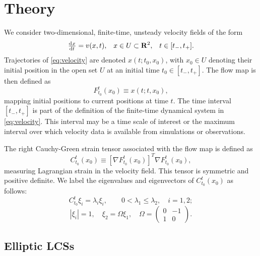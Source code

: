 \documentclass{article}
\begin{document}
\section{Theory}

We consider two-dimensional, finite-time, unsteady velocity fields of the form
\begin{align}
\od{x}{t} = v(x,t), && x \in U \subset \mathbf R^2, && t \in [t_-,t_+].
\label{eq:velocity}
\end{align}
Trajectories of \cref{eq:velocity} are denoted $x(t;t_0,x_0)$, with $x_0 \in U$ denoting their initial position in the open set $U$ at an initial time $t_0 \in [t_-,t_+]$. The flow map is then defined as
\[
F_{t_0}^t(x_0) \equiv x(t;t,x_0),
\]
mapping initial positions to current positions at time $t$. The time interval $[t_-,t_+]$ is part of the definition of the finite-time dynamical system in \cref{eq:velocity}. This interval may be a time scale of interest or the maximum interval over which velocity data is available from simulations or observations.

The right Cauchy-Green strain tensor associated with the flow map is defined as
\begin{equation}
C_{t_0}^t(x_0) \equiv \left[\nabla F_{t_0}^t(x_0)\right]^T \nabla F_{t_0}^t(x_0),
\label{eq:CG}
\end{equation}
measuring Lagrangian strain in the velocity field. This tensor is symmetric and positive definite\parencite{truesdell04}. We label the eigenvalues and eigenvectors of $C_{t_0}^t(x_0)$ as follows:
\[
C_{t_0}^t \xi_i = \lambda_i \xi_i, \qquad 0 < \lambda_1 \leq \lambda_2, \quad i = 1,2;
\]
\begin{equation}
\left|\xi_i\right| = 1, \quad \xi_2 = \Omega \xi_1, \quad \Omega = \left(
\begin{array}{rr}
0 & -1\\
1 & 0
\end{array}
\right).
\label{eq:CG_invariants}
\end{equation}

\subsection{Elliptic LCSs}
\label{sec:Elliptic LCSs}
\end{document}
